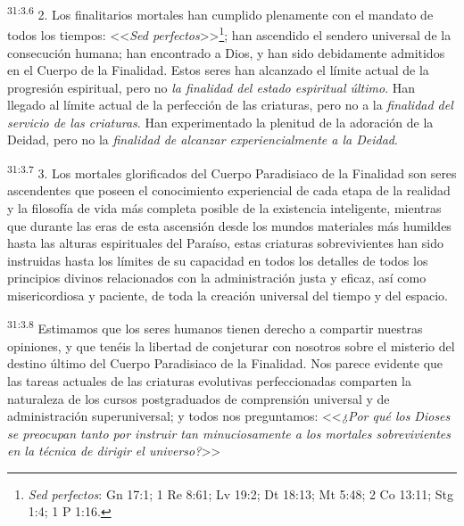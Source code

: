 \par
\textsuperscript{31:3.6} 2. Los finalitarios mortales han cumplido plenamente con el mandato de todos los tiempos: <<\textit{Sed perfectos}>>\footnote{\textit{Sed perfectos}: Gn 17:1; 1 Re 8:61; Lv 19:2; Dt 18:13; Mt 5:48; 2 Co 13:11; Stg 1:4; 1 P 1:16.}; han ascendido el sendero universal de la consecución humana; han encontrado a Dios, y han sido debidamente admitidos en el Cuerpo de la Finalidad. Estos seres han alcanzado el límite actual de la progresión espiritual, pero no \textit{la finalidad del estado espiritual último}. Han llegado al límite actual de la perfección de las criaturas, pero no a la \textit{finalidad del servicio de las criaturas}. Han experimentado la plenitud de la adoración de la Deidad, pero no la \textit{finalidad de alcanzar experiencialmente a la Deidad}.

\par
\textsuperscript{31:3.7} 3. Los mortales glorificados del Cuerpo Paradisiaco de la Finalidad son seres ascendentes que poseen el conocimiento experiencial de cada etapa de la realidad y la filosofía de vida más completa posible de la existencia inteligente, mientras que durante las eras de esta ascensión desde los mundos materiales más humildes hasta las alturas espirituales del Paraíso, estas criaturas sobrevivientes han sido instruidas hasta los límites de su capacidad en todos los detalles de todos los principios divinos relacionados con la administración justa y eficaz, así como misericordiosa y paciente, de toda la creación universal del tiempo y del espacio.

\par
\textsuperscript{31:3.8} Estimamos que los seres humanos tienen derecho a compartir nuestras opiniones, y que tenéis la libertad de conjeturar con nosotros sobre el misterio del destino último del Cuerpo Paradisiaco de la Finalidad. Nos parece evidente que las tareas actuales de las criaturas evolutivas perfeccionadas comparten la naturaleza de los cursos postgraduados de comprensión universal y de administración superuniversal; y todos nos preguntamos: <<\textit{¿Por qué los Dioses se preocupan tanto por instruir tan minuciosamente a los mortales sobrevivientes en la técnica de dirigir el universo?}>>

